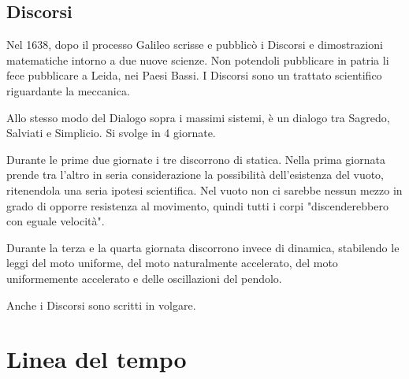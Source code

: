 \documentclass[a4paper]{scrartcl}
\begin{document}
\subsection{Discorsi}

Nel 1638, dopo il processo Galileo scrisse e pubblicò i Discorsi e dimostrazioni matematiche intorno a due nuove scienze. Non potendoli pubblicare in patria li fece pubblicare a Leida, nei Paesi Bassi.
I Discorsi sono un trattato scientifico riguardante la meccanica.

Allo stesso modo del Dialogo sopra i massimi sistemi, è un dialogo tra Sagredo, Salviati e Simplicio. Si svolge in 4 giornate. 

Durante le prime due giornate i tre discorrono di statica.
Nella prima giornata prende tra l'altro in seria considerazione la possibilità dell'esi\-sten\-za del vuoto, ritenendola una seria ipotesi scientifica. Nel vuoto non  ci sarebbe nessun mezzo in grado di opporre resistenza al movimento, quindi tutti i corpi "discenderebbero con eguale velocità".

Durante la terza e la quarta giornata discorrono invece di dinamica, stabilendo le leggi del moto uniforme, del moto naturalmente accelerato, del moto uniformemente accelerato e delle oscillazioni del pendolo.

Anche i Discorsi sono scritti in volgare.


\pagebreak

\section{Linea del tempo}


\startchronology[startyear=1450,stopyear=1750,height=.2ex]







\end{document}
